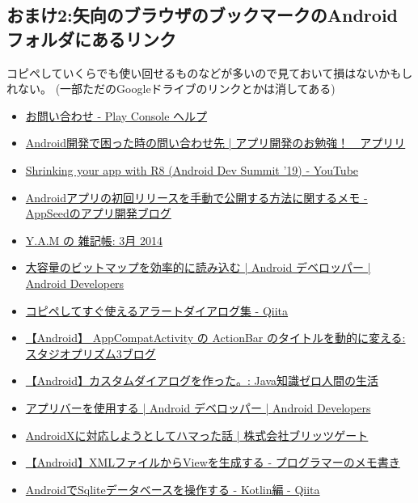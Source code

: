 \documentclass[dvipdfmx,jb5]{jreport}
\newcommand{\link}[2]{\href{#2}{#1}}
\begin{document}
\subsection{おまけ2:矢向のブラウザのブックマークのAndroidフォルダにあるリンク}
コピペしていくらでも使い回せるものなどが多いので見ておいて損はないかもしれない。
(一部ただのGoogleドライブのリンクとかは消してある)
\begin{itemize}
      \item \link{お問い合わせ - Play Console ヘルプ}{https://support.google.com/googleplay/android-developer/gethelp?hl=ja\&visit\_id=637678981545128687-2809304254\&rd=1\#}
      \item \link{Android開発で困った時の問い合わせ先 | アプリ開発のお勉強！　アプリリ}{https://bit.ly/3on3bmL}
      \item \link{Shrinking your app with R8 (Android Dev Summit '19) - YouTube}{https://www.youtube.com/watch?v=uQ_yK8kRCaA}
      \item \link{Androidアプリの初回リリースを手動で公開する方法に関するメモ - AppSeedのアプリ開発ブログ}{https://develop.hateblo.jp/entry/google-play-manual-release}
      \item \link{Y.A.M の 雑記帳: 3月 2014}{http://y-anz-m.blogspot.com/2014/03/}
      \item \link{大容量のビットマップを効率的に読み込む  |  Android デベロッパー  |  Android Developers}{https://developer.android.com/topic/performance/graphics/load-bitmap?hl=ja}
      \item \link{コピペしてすぐ使えるアラートダイアログ集 - Qiita}{https://qiita.com/suzukihr/items/8973527ebb8bb35f6bb8}
      \item \link{【Android】 AppCompatActivity の ActionBar のタイトルを動的に変える: スタジオプリズム\UTF{3427}3ブログ}{http://s-prism3.seesaa.net/article/438905821.html}
      \item \link{【Android】カスタムダイアログを作った。: Java知識ゼロ人間の生活}{http://stren-blog.seesaa.net/article/367038846.html}
      \item \link{アプリバーを使用する  |  Android デベロッパー  |  Android Developers}{https://developer.android.com/guide/fragments/appbar?hl=ja}
      \item \link{AndroidXに対応しようとしてハマった話 | 株式会社ブリッツゲート}{https://blitzgate.co.jp/blog/2350/}
      \item \link{【Android】XMLファイルからViewを生成する - プログラマーのメモ書き}{https://bit.ly/3wDqZq9}
      \item \link{AndroidでSqliteデータベースを操作する - Kotlin編 - Qiita}{https://qiita.com/NaoSekig/items/0d95d631378040c1961a}

\end{itemize}
\end{document}
